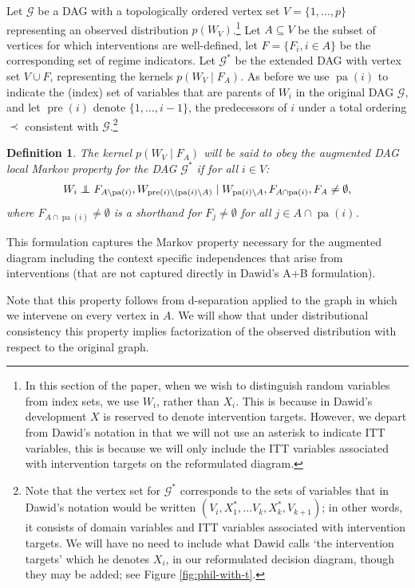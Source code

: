 \documentclass[11pt]{article}
\DeclareMathOperator{\pa}{pa}
\DeclareMathOperator{\pre}{pre}
\newtheorem{definition}[theorem]{Definition}
\newcommand{\G}{{\mathscr G}}
\newcommand\indep{\protect\mathpalette{\protect\independenT}{\perp}}
\def\independenT#1#2{\mathrel{\rlap{$#1#2$}\mkern2.5mu{#1#2}}}
\begin{document}
{Let $\G$ be a DAG with a topologically ordered vertex set $V=\{1,\ldots ,p\}$  representing an observed distribution $p(W_V)$.\footnote{In this section of the paper, when we wish to distinguish random variables from index sets, we use $W_i$, rather than $X_i$. This is because
in Dawid's development $X$ is reserved to denote intervention targets. However, we depart from Dawid's notation in that we will not use an asterisk to indicate ITT variables, this is because we will only include the ITT variables associated with intervention targets on the reformulated diagram.}
Let $A \subseteq V$ be the subset of vertices for which interventions are well-defined, let $F = \{F_i, i \in A\}$ be the corresponding set of regime indicators.  Let $\G^*$ be the extended DAG with vertex set $V\cup F$, representing the kernels $p(W_V \mid F_A)$.
As before we use $\pa(i)$ to indicate the (index) set of variables that are parents of $W_i$ in the original DAG $\G$, and let
$\pre(i)$  denote  $\{1,\ldots ,i-1\}$, the predecessors of $i$ under a total ordering $\prec$ consistent with $\G$.\footnote{Note that the vertex set for $\G^*$ corresponds to the sets of variables that in Dawid's notation would be written $(V_i,X_1^*,\ldots V_k, X_k^*,V_{k+1})$; in other words, it consists of domain variables and ITT variables associated with intervention targets. We will have no need to include what Dawid calls `the intervention targets' which he denotes $X_i$, in our reformulated decision diagram, though they may be added; see Figure \protect\ref{fig:phil-with-t}.}


\begin{definition}\label{def:local-swig-mp-phil}
The kernel $p(W_V \mid F_A)$ will be said to obey the augmented DAG local Markov property for the DAG $\G^*$ if for all $i\in V$:
\begin{align}\label{eq:local-ind}
W_i \indep F_{A\setminus \pa(i)}, W_{\pre(i) \setminus (\pa(i)\setminus A)}
\mid W_{\pa(i) \setminus A}, F_{A \cap \pa(i)},  F_{A} \neq \emptyset,
\end{align}
where $F_{A\cap \pa(i)} \neq \emptyset$ is a shorthand for $F_j \neq \emptyset$ for all $j \in A\cap \pa(i)$.
\end{definition}

This formulation captures the Markov property necessary for the augmented diagram including the context specific independences that arise from interventions (that are not captured directly in Dawid's A+B formulation).

Note that this property follows from d-separation applied to the graph in which we intervene on every vertex in $A$.
 We will show that under distributional consistency this property 
implies factorization of the observed distribution with respect to the original graph.

}
\end{document}
